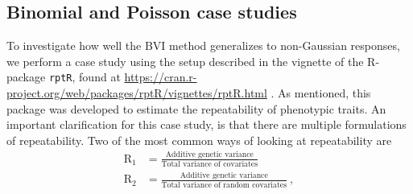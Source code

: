 \subsection{Binomial and Poisson case studies}
To investigate how well the BVI method generalizes to non-Gaussian responses, we perform a case study using the setup described in the vignette of the R-package \texttt{rptR}, found at \url{https://cran.r-project.org/web/packages/rptR/vignettes/rptR.html} \citep{Stoffel2017rptR}. 
As mentioned, this package was developed to estimate the repeatability of phenotypic traits.
An important clarification for this case study, is that there are multiple formulations of repeatability. Two of the most common ways of looking at repeatability are
\begin{equation}
    \begin{aligned}
        \text{R}_1 &= \frac{\text{Additive genetic variance}}{\text{Total variance of covariates}} \\
        \text{R}_2 &= \frac{\text{Additive genetic variance}}{\text{Total variance of random covariates}} \ ,
    \end{aligned}
\end{equation}
